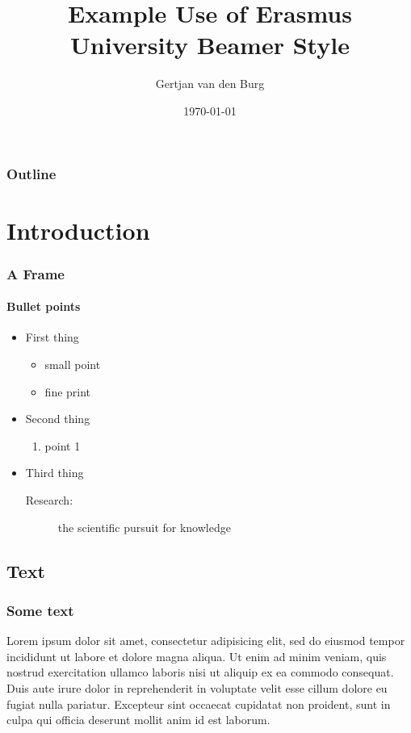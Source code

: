 \documentclass[]{beamer}
\title{Example Use of Erasmus University Beamer Style}
\author{Gertjan van den Burg}
\date{\today}
\institute{Econometric Institute}
\begin{document}
\begin{frame}[plain]
	\titlepage
\end{frame}

\begin{frame}[t]
	\frametitle{Outline}
	\tableofcontents
\end{frame}


\section{Introduction}
\begin{frame}
	\frametitle{A Frame}
	\framesubtitle{Bullet points}
	\begin{itemize}
		\item First thing
		\begin{itemize}
			\item small point
			\item fine print
		\end{itemize}
		\item Second thing
		\begin{enumerate}
			\item point 1
		\end{enumerate}
		\item Third thing
		\begin{description}
			\item[Research:] the scientific pursuit for knowledge
		\end{description}
	\end{itemize}
\end{frame}

\subsection{Text}
\begin{frame}
	\frametitle{Some text}
	Lorem ipsum dolor sit amet, consectetur adipisicing elit, sed do 
	eiusmod tempor incididunt ut labore et dolore magna aliqua. Ut enim ad 
	minim veniam, quis nostrud exercitation ullamco laboris nisi ut aliquip 
	ex ea commodo consequat. Duis aute irure dolor in reprehenderit in 
	voluptate velit esse cillum dolore eu fugiat nulla pariatur. Excepteur 
	sint occaecat cupidatat non proident, sunt in culpa qui officia 
	deserunt mollit anim id est laborum.
\end{frame}
\end{document}
